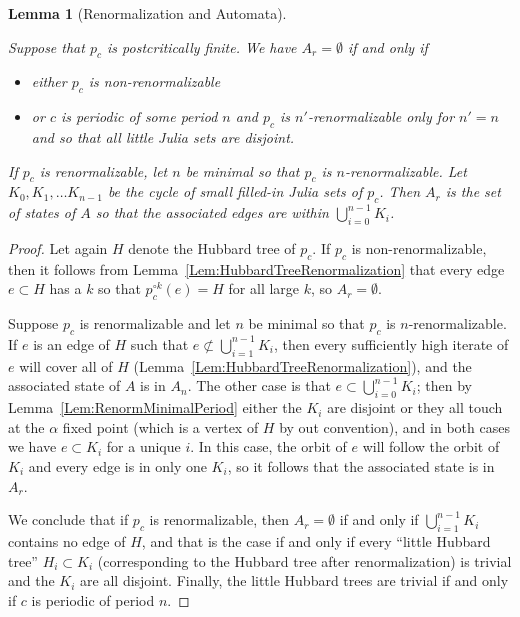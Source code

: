 \documentclass[12pt]{amsart}
\newcommand{\0}{\texttt{0}}
\newcommand{\1}{\texttt{1}}
\newtheorem{lemma}[theorem]{Lemma}
\theoremstyle{definition}
\numberwithin{equation}{section}
\newcommand{\lineclear}{\rule{0pt}{2pt}\newline}
\begin{document}
\begin{lemma}[Renormalization and Automata]
\label{Lem:RenormAutom} \lineclear 
Suppose that $p_c$ is postcritically finite. 
We have $A_r=\emptyset$ if and only if  
\begin{itemize}
\item 
either $p_c$ is non-renormalizable 
\item
or $c$ is periodic of some period $n$ and $p_c$ is $n'$-renormalizable only for $n'=n$ and so that all little Julia sets are disjoint.
\end{itemize}

If $p_c$ is renormalizable, let $n$ be minimal so that $p_c$ is $n$-renormalizable. Let $K_0,K_1,\dots K_{n-1}$ be the cycle of small filled-in Julia sets of $p_c$. Then $A_r$ is the set of states of $A$ so that the associated edges are within $\bigcup_{i=0}^{n-1}K_i$.
\end{lemma}
\begin{proof}
Let again $H$ denote the Hubbard tree of $p_c$.
If $p_c$ is non-renormalizable, then it follows from Lemma~\ref{Lem:HubbardTreeRenormalization} that every edge $e\subset H$ has a $k$ so that $p_c^{\circ k}(e)=H$ for all large $k$, so $A_r=\emptyset$. 

Suppose $p_c$ is renormalizable and let $n$ be minimal so that $p_c$ is $n$-renormalizable. If $e$ is an edge of $H$ such that $e\not\subset \bigcup_{i=1}^{n-1} K_i$, then every sufficiently high iterate of $e$ will cover all of $H$ (Lemma~\ref{Lem:HubbardTreeRenormalization}), and the associated state of $A$ is in $A_n$. The other case is that $e\subset \bigcup_{i=0}^{n-1}K_i$; then by Lemma~\ref{Lem:RenormMinimalPeriod} either the $K_i$ are disjoint or they all touch at the $\alpha$ fixed point (which is a vertex of $H$ by out convention), and in both cases we have $e\subset K_i$ for a unique $i$. In this case, the orbit of $e$ will follow the orbit of $K_i$ and every edge is in only one $K_i$, so it follows that the associated state is in $A_r$. 



We conclude that if $p_c$ is renormalizable, then $A_r=\emptyset$ if and only if $\bigcup_{i=1}^{n-1} K_i$ contains no edge of $H$, and that is the case if and only if every ``little Hubbard tree'' $H_i\subset K_i$ (corresponding to the Hubbard tree after renormalization) is trivial and the $K_i$ are all disjoint. Finally, the little Hubbard trees are trivial if and only if $c$ is periodic of period $n$. 
\end{proof}
\end{document}
